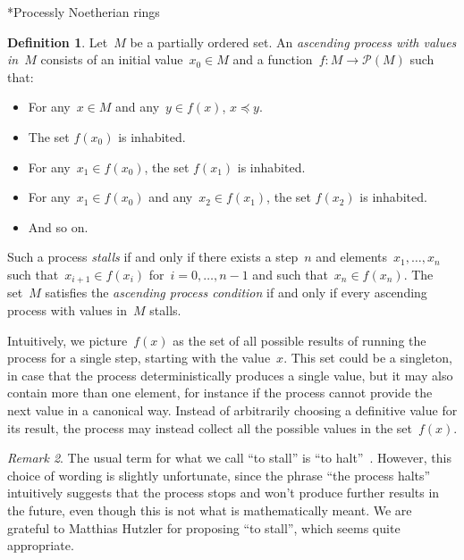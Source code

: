 \documentclass[10pt,reqno,a4paper]{amsbook}
\makeatletter
\theoremstyle{definition}
\newtheorem{defn}{Definition}[section]
\theoremstyle{plain}
\theoremstyle{remark}
\newtheorem{rem}[defn]{Remark}
\renewcommand{\P}{\mathcal{P}}
\newcommand{\?}{\,{:}\,}
\renewcommand{\_}{\mathpunct{.}\,}
\newcommand{\nocontentsline}[3]{}
\newcommand{\tocless}[1]{\let\addcontentsline=\nocontentsline}
\def\subsection{\@startsection{subsection}{2}%
  {0pt}{.5\linespacing\@plus.7\linespacing}{-.5em}%
  {\normalfont\bfseries}}
\makeatother
\begin{document}
{\tocless

\subsection*{Processly Noetherian rings}

\begin{defn}Let~$M$ be a partially ordered set. An \emph{ascending process
with values in~$M$} consists of an initial value~$x_0 \in M$ and a function~$f
: M \to \P(M)$ such that:
\begin{itemize}
\item For any~$x \in M$ and any~$y \in f(x)$, $x \preceq y$.
\item The set $f(x_0)$ is inhabited.
\item For any~$x_1 \in f(x_0)$, the set $f(x_1)$ is inhabited.
\item For any~$x_1 \in f(x_0)$ and any~$x_2 \in f(x_1)$, the set $f(x_2)$ is inhabited.
\item And so on.
\end{itemize}
Such a process \emph{stalls} if and only if there
exists a step~$n$ and elements~$x_1, \ldots, x_n$ such that~$x_{i+1}
\in f(x_i)$ for~$i = 0,\ldots,n-1$ and such that~$x_n \in f(x_n)$.
The set~$M$ satisfies the \emph{ascending process condition} if and only if every
ascending process with values in~$M$ stalls.
\end{defn}

Intuitively, we picture~$f(x)$ as the set of all possible results of running
the process for a single step, starting with the value~$x$. This set could
be a singleton, in case that the process deterministically produces a single
value, but it may also contain more than one element, for instance if
the process cannot provide the next value in a canonical way. Instead of
arbitrarily choosing a definitive value for its result, the process may instead
collect all the possible values in the set~$f(x)$.

\begin{rem}The usual term for what we call ``to stall'' is
``to halt''~\cite{richman:noetherian,perdry-schuster:noetherian}. However, this
choice of wording is slightly unfortunate, since the phrase ``the process
halts'' intuitively suggests that the process stops and won't produce further
results in the future, even though this is not what is mathematically meant. We
are grateful to Matthias Hutzler for proposing ``to stall'', which seems quite
appropriate.
\end{rem}

}
\end{document}
